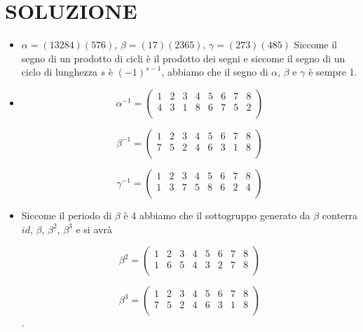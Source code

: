 \documentclass[a4paper,10pt]{article}
\begin{document}
\section{SOLUZIONE}
\begin{itemize}
 \item $\alpha = (13284)(576)$, $\beta = (17)(2365)$, $\gamma = (273)(485)$  
 Siccome il segno di un prodotto di cicli è il prodotto dei segni e siccome il segno di un ciclo di lunghezza $s$ è $(-1)^{s-1}$, 
 abbiamo che il segno di $\alpha$, $\beta$ e $\gamma$ è sempre 1.
 \item  
 \[
 \alpha^{-1} = \left( \begin{array}{cccccccc}
                  1 & 2 & 3 & 4 & 5 & 6 & 7 & 8 \\
                  4 & 3 & 1 & 8 & 6 & 7 & 5 & 2 \\
                 \end{array}
 \right)
\]

\[
  \beta^{-1} = \left( \begin{array}{cccccccc}
                  1 & 2 & 3 & 4 & 5 & 6 & 7 & 8 \\
                  7 & 5 & 2 & 4 & 6 & 3 & 1 & 8 \\
                 \end{array}
 \right)
\]

\[
  \gamma^{-1} = \left( \begin{array}{cccccccc}
                  1 & 2 & 3 & 4 & 5 & 6 & 7 & 8 \\
                  1 & 3 & 7 & 5 & 8 & 6 & 2 & 4 \\
                 \end{array}
 \right)
\]
  
  \item
  Siccome il periodo di $\beta$ è 4 abbiamo che il sottogruppo generato da $\beta$ conterra $id$, $\beta$, $\beta^2$, $\beta^3$ e si avrà
  
  \[
  \beta^{2} = \left( \begin{array}{cccccccc}
                  1 & 2 & 3 & 4 & 5 & 6 & 7 & 8 \\
                  1 & 6 & 5 & 4 & 3 & 2 & 7 & 8 \\
                 \end{array}
 \right)
 \]
 
  \[
  \beta^{3} = \left( \begin{array}{cccccccc}
                  1 & 2 & 3 & 4 & 5 & 6 & 7 & 8 \\
                  7 & 5 & 2 & 4 & 6 & 3 & 1 & 8 \\
                 \end{array}
 \right)
 \].
 
 
\end{itemize}
\end{document}
